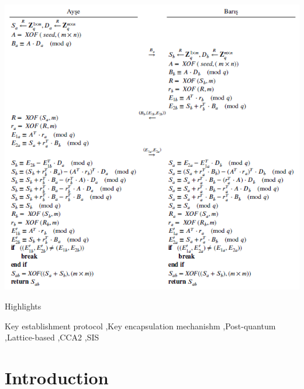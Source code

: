 \documentclass[a4paper,fleqn]{cas-dc}
\begin{document}
\begin{graphicalabstract}
	\includegraphics{figs/graphical_abstract.png}
\end{graphicalabstract}

\begin{highlights}
	\item Highlights
\end{highlights}

\begin{keywords}
	Key establishment protocol \sep Key encapsulation mechanishm \sep Post-quantum \sep Lattice-based \sep CCA2 \sep SIS
\end{keywords}


\maketitle



\section{Introduction}
\end{document}
